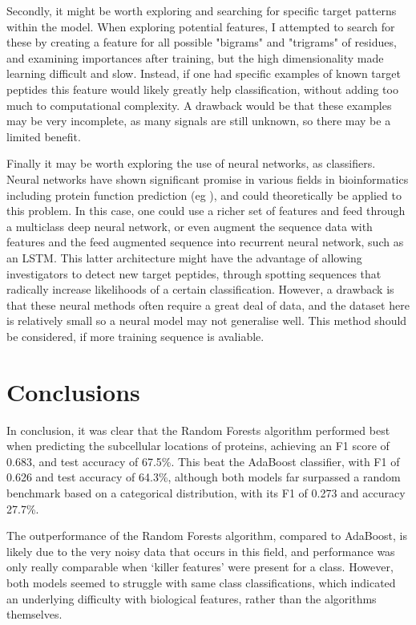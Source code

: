 \documentclass{bioinfo}
\begin{document}
Secondly, it might be worth exploring and searching for specific target patterns within the model. 
When exploring potential features, I attempted to search for these by creating a feature for all possible "bigrams" and "trigrams" of residues, and examining importances after training, but the high dimensionality made learning difficult and slow. 
Instead, if one had specific examples of known target peptides this feature would likely greatly help classification, without adding too much to computational complexity.
A drawback would be that these examples may be very incomplete, as many signals are still unknown, so there may be a limited benefit.

Finally it may be worth exploring the use of neural networks, as classifiers.
Neural networks have shown significant promise in various fields in bioinformatics including protein function prediction (eg \cite{protfun}), and could theoretically be applied to this problem. 
In this case, one could use a richer set of features and feed through a multiclass deep neural network, or even augment the sequence data with features and the feed augmented sequence into recurrent neural network, such as an LSTM. 
This latter architecture might have the advantage of allowing investigators to detect new target peptides, through spotting sequences that radically increase likelihoods of a certain classification.
However, a drawback is that these neural methods often require a great deal of data, and the dataset here is relatively small so a neural model may not generalise well.
This method should be considered, if more training sequence is avaliable.

\section{Conclusions}

In conclusion, it was clear that the Random Forests algorithm performed best when predicting the subcellular locations of proteins, achieving an F1 score of 0.683, and test accuracy of 67.5\%. This beat the AdaBoost classifier, with F1 of 0.626 and test accuracy of 64.3\%, although both models far surpassed a random benchmark based on a categorical distribution, with its F1 of 0.273 and accuracy 27.7\%. 

The outperformance of the Random Forests algorithm, compared to AdaBoost, is likely due to the very noisy data that occurs in this field, and performance was only really comparable when `killer features' were present for a class. However, both models seemed to struggle with same class classifications, which indicated an underlying difficulty with biological features, rather than the algorithms themselves.
\end{document}
